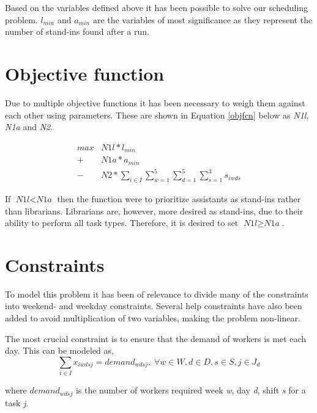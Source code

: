 
Based on the variables defined above it has been possible to solve our scheduling problem. \textit{$l_{min}$} and \textit{$a_{min}$} are the variables of most significance as they represent the number of stand-ins found after a run. 

\section{Objective function}
Due to multiple objective functions it has been necessary to weigh them against each other using parameters. These are shown in Equation \ref{objfcn} below as \textit{N1l}, \textit{N1a} and \textit{N2}.

\begin{equation} \label{objfcn}
\begin{split}
max &N1l*l_{min}\\
 + &N1a*a_{min} \\
 - &N2*\sum_{i \in I}\sum_{w = 1}^{5}\sum_{d = 1}^{5}\sum_{s = 1}^{3} s_{iwds}
\end{split}
\end{equation}

If $\textit{N1l} < \textit{N1a}$ then the function were to prioritize assistants as stand-ins rather than librarians. Librarians are, however, more desired as stand-ins, due to their ability to perform all task types. Therefore, it is desired to set $\textit{N1l} \geq \textit{N1a}$.

\section{Constraints} \label{constraints}
To model this problem it has been of relevance to divide many of the constraints into weekend- and weekday constraints. Several help constraints have also been added to avoid multiplication of two variables, making the problem non-linear.

The most crucial constraint is to ensure that the demand of workers is met each day. This can be modeled as,
\begin{equation}
\sum_{i \in I} x_{iwdsj} = demand_{wdsj}, \; \forall w\in W,d\in D,s\in S,j\in J_d
\end{equation}

where $demand_{wdsj}$ is the number of workers required week \textit{w}, day \textit{d}, shift \textit{s} for a task \textit{j}.

